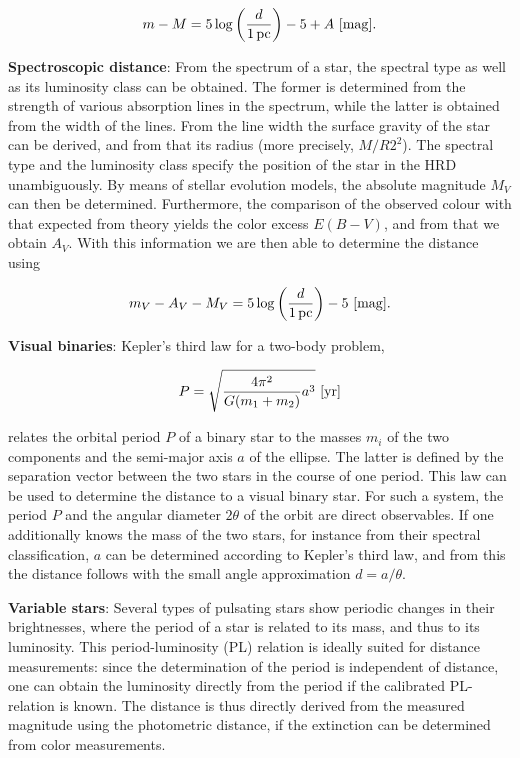 \documentclass[a4paper,10pt]{article}
\begin{document}
\begin{align*}
    m-M = 5\log\left(\frac{d}{1\,{\rm pc}}\right)-5+A ~ [{\rm mag}].
\end{align*}

{\noindent}\textbf{Spectroscopic distance}: From the spectrum of a star, the spectral type as well as its luminosity class can be obtained. The former is determined from the strength of various absorption lines in the spectrum, while the latter is obtained from the width of the lines. From the line width the surface gravity of the star can be derived, and from that its radius (more precisely, $M/R2^2$). The spectral type and the luminosity class specify the position of the star in the HRD unambiguously. By means of stellar evolution models, the absolute magnitude $M_V$ can then be determined. Furthermore, the comparison of the observed colour with that expected from theory yields the color excess $E(B-V)$, and from that we obtain $A_V$. With this information we are then able to determine the distance using

\begin{align*}
    m_V-A_V-M_V = 5\log\left(\frac{d}{1\,{\rm pc}}\right)-5 ~ [{\rm mag}].
\end{align*}

{\noindent}\textbf{Visual binaries}: Kepler’s third law for a two-body problem,

\begin{align*}
    P = \sqrt{\frac{4\pi^2}{G(m_1+m_2)}a^3} ~ [{\rm yr}]
\end{align*}

{\noindent}relates the orbital period $P$ of a binary star to the masses $m_i$ of the two components and the semi-major axis $a$ of the ellipse. The latter is defined by the separation vector between the two stars in the course of one period. This law can be used to determine the distance to a visual binary star. For such a system, the period $P$ and the angular diameter $2\theta$ of the orbit are direct observables. If one additionally knows the mass of the two stars, for instance from their spectral classification, $a$ can be determined according to Kepler's third law, and from this the distance follows with the small angle approximation $d=a/\theta$.

{\noindent}\textbf{Variable stars}: Several types of pulsating stars show periodic changes in their brightnesses, where the period of a star is related to its mass, and thus to its luminosity. This period-luminosity (PL) relation is ideally suited for distance measurements: since the determination of the period is independent of distance, one can obtain the luminosity directly from the period if the calibrated PL-relation is known. The distance is thus directly derived from the measured magnitude using the photometric distance, if the extinction can be determined from color measurements.
\end{document}
